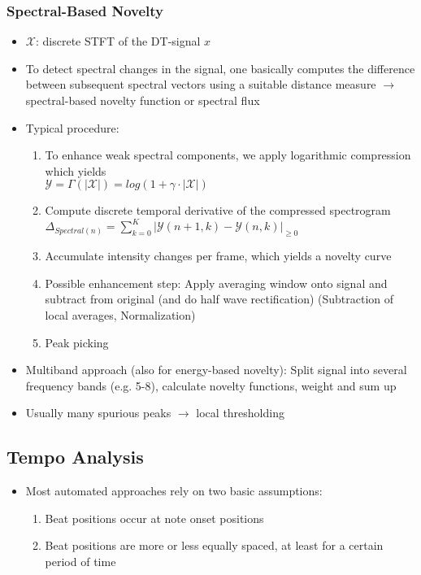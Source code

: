 \documentclass{scrartcl}
\begin{document}
\subsubsection*{Spectral-Based Novelty}
\begin{itemize}
    \item
	$\mathcal{X}$: discrete STFT of the DT-signal $x$
    \item
	To detect spectral changes in the signal, one basically computes the difference between subsequent spectral vectors using a suitable distance measure $\rightarrow$ spectral-based novelty function or spectral flux
    \item
	Typical procedure:
	\begin{enumerate}
	    \item
		To enhance weak spectral components, we apply logarithmic compression which yields\\
		$\mathcal{Y} = \Gamma(|\mathcal{X}|) = log(1+\gamma \cdot |\mathcal{X}|)$
	    \item
		Compute discrete temporal derivative of the compressed spectrogram\\
		$\Delta_{Spectral(n)} = \sum_{k=0}^{K}|\mathcal{Y}(n+1,k)-\mathcal{Y}(n,k)|_{\geq 0}$
	    \item
		Accumulate intensity changes per frame, which yields a novelty curve
	    \item
		Possible enhancement step: Apply averaging window onto signal and subtract from original (and do half wave rectification) (Subtraction of local averages, Normalization)
	    \item
		Peak picking
	\end{enumerate}
    \item
	Multiband approach (also for energy-based novelty): Split signal into several frequency bands (e.g. 5-8), calculate novelty functions, weight and sum up
    \item
	Usually many spurious peaks $\rightarrow$ local thresholding
\end{itemize}

\subsection*{Tempo Analysis}
\begin{itemize}
    \item
	Most automated approaches rely on two basic assumptions:
	\begin{enumerate}
	    \item
		Beat positions occur at note onset positions
	    \item
		Beat positions are more or less equally spaced, at least for a certain period of time
	\end{enumerate}
\end{itemize}
\end{document}
